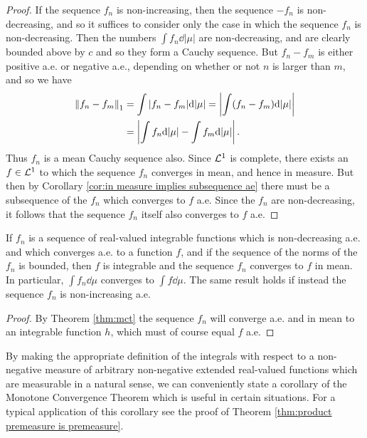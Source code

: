 \begin{proof}
If the sequence $f_n$ is non-increasing, then the sequence $-f_n$ is non-decreasing, and so it suffices to consider only the case in which the sequence $f_n$ is non-decreasing. Then the numbers $\int f_n\dd|\mu|$ are non-decreasing, and are clearly bounded above by $c$ and so they form a Cauchy sequence. But $f_n-f_m$ is either positive a.e. or negative a.e., depending on whether or not $n$ is larger than $m$, and so we have \begin{align*}
    \norm{f_n-f_m}_1&=\int|f_n-f_m|\dd|\mu|=\left\lvert\int(f_n-f_m)\dd|\mu|\right\rvert\\
    &=\left\lvert\int f_n\dd|\mu|-\int f_m\dd|\mu|\right\rvert.
\end{align*} Thus $f_n$ is a mean Cauchy sequence also. Since ${\cal L}^1$ is complete, there exists an $f\in{\cal L}^1$ to which the sequence $f_n$ converges in mean, and hence in measure. But then by Corollary \ref{cor:in measure implies subsequence ae} there must be a subsequence of the $f_n$ which converges to $f$ a.e. Since the $f_n$ are non-decreasing, it follows that the sequence $f_n$ itself also converges to $f$ a.e.
\end{proof}

\begin{corollary}\label{cor:mct}
If $f_n$ is a sequence of real-valued integrable functions which is non-decreasing a.e. and which converges a.e. to a function $f$, and if the sequence of the norms of the $f_n$ is bounded, then $f$ is integrable and the sequence $f_n$ converges to $f$ in mean. In particular, $\int f_n\dd\mu$ converges to $\int f\dd\mu$. The same result holds if instead the sequence $f_n$ is non-increasing a.e.
\end{corollary} 

\begin{proof}
By Theorem \ref{thm:mct} the sequence $f_n$ will converge a.e. and in mean to an integrable function $h$, which must of course equal $f$ a.e.
\end{proof}

By making the appropriate definition of the integrals with respect to a non-negative measure of arbitrary non-negative extended real-valued functions which are measurable in a natural sense, we can conveniently state a corollary of the Monotone Convergence Theorem which is useful in certain situations. For a typical application of this corollary see the proof of Theorem \ref{thm:product premeasure is premeasure}.

